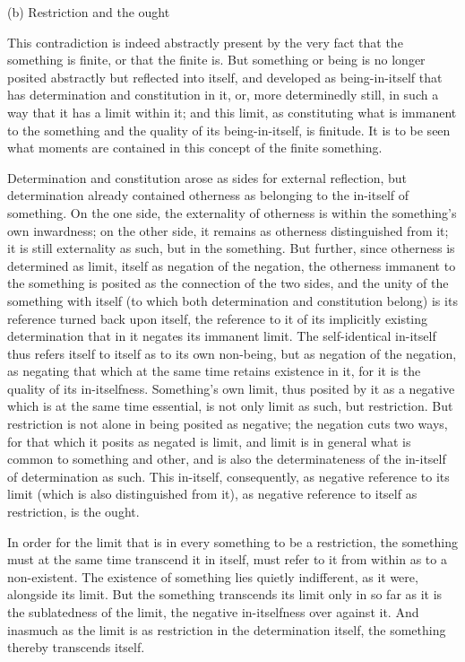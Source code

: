 (b) Restriction and the ought

This contradiction is indeed abstractly present
by the very fact that the something is finite,
or that the finite is.
But something or being is no longer posited abstractly
but reflected into itself,
and developed as being-in-itself
that has determination and constitution in it,
or, more determinedly still, in such a way
that it has a limit within it;
and this limit, as constituting
what is immanent to the something
and the quality of its being-in-itself,
is finitude.
It is to be seen what moments are contained
in this concept of the finite something.

Determination and constitution arose as sides for external reflection,
but determination already contained otherness
as belonging to the in-itself of something.
On the one side, the externality of otherness is
within the something's own inwardness;
on the other side, it remains as otherness distinguished from it;
it is still externality as such, but in the something.
But further, since otherness is determined as limit,
itself as negation of the negation,
the otherness immanent to the something is posited as the
connection of the two sides,
and the unity of the something with itself
(to which both determination and constitution belong)
is its reference turned back upon itself,
the reference to it of its implicitly existing determination
that in it negates its immanent limit.
The self-identical in-itself thus refers
itself to itself as to its own non-being,
but as negation of the negation,
as negating that which at the same time retains existence in it,
for it is the quality of its in-itselfness.
Something's own limit, thus posited by it as a
negative which is at the same time essential,
is not only limit as such, but restriction.
But restriction is not alone in being posited as negative;
the negation cuts two ways, for that which it posits as negated is limit,
and limit is in general what is common to something and other,
and is also the determinateness of the in-itself of determination as such.
This in-itself, consequently, as negative reference to its limit
(which is also distinguished from it),
as negative reference to itself as restriction,
is the ought.

In order for the limit that is in every something to be a restriction,
the something must at the same time transcend it in itself,
must refer to it from within as to a non-existent.
The existence of something lies quietly indifferent,
as it were, alongside its limit.
But the something transcends its limit only
in so far as it is the sublatedness of the limit,
the negative in-itselfness over against it.
And inasmuch as the limit is as restriction
in the determination itself,
the something thereby transcends itself.

